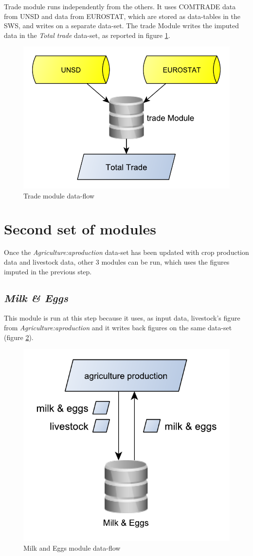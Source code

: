\documentclass[]{article}
\begin{document}
Trade module runs independently from the others. It uses COMTRADE data
from UNSD and data from EUROSTAT, which are stored as data-tables in the
SWS, and writes on a separate data-set. The trade Module writes the
imputed data in the \emph{Total trade} data-set, as reported in figure
\ref{fig:f8}.

\begin{figure}[H]

{\centering \includegraphics[width=0.45\linewidth]{images/SwsFbs/08_trade} 

}

\caption{\label{fig:f8}Trade module data-flow}\label{fig:f8}
\end{figure}

\section{Second set of modules}\label{second-set-of-modules}

Once the \emph{Agriculture:aproduction} data-set has been updated with
crop production data and livestock data, other 3 modules can be run,
which uses the figures imputed in the previous step.

\subsection{\texorpdfstring{\emph{Milk \&
Eggs}}{Milk \& Eggs}}\label{milk-eggs}

This module is run at this step because it uses, as input data,
livestock's figure from \emph{Agriculture:aproduction} and it writes
back figures on the same data-set (figure \ref{fig:f9}).

\begin{figure}[H]

{\centering \includegraphics[width=0.36\linewidth]{images/SwsFbs/09_milkEggs} 

}

\caption{\label{fig:f9}Milk and Eggs module data-flow}\label{fig:f9}
\end{figure}
\end{document}
